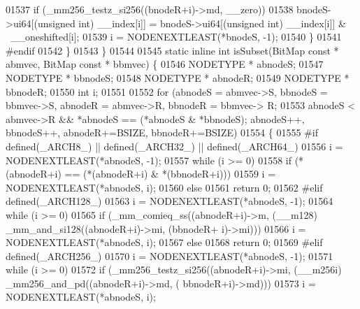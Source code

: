 \begin{DoxyCode}
{01537                         \textcolor{keywordflow}{if} (\_mm256\_testz\_si256((bnodeR+i)->md, \_\_zero))
01538                                 bnodeS->ui64[(\textcolor{keywordtype}{unsigned} int) \_\_index[i]] = bnodeS->ui64[(\textcolor{keywordtype}{unsigned} \textcolor{keywordtype}{int}) 
      \_\_index[i]] & ~\_\_oneshifted[i];
01539                         i = NODENEXTLEAST(*bnodeS, -1);
01540                 \}
01541 \textcolor{preprocessor}{#endif}
01542         \}
01543 \}
01544 
01545 \textcolor{keyword}{static} \textcolor{keyword}{inline} \textcolor{keywordtype}{int} isSubset(BitMap \textcolor{keyword}{const} * abmvec, BitMap \textcolor{keyword}{const} * bbmvec) \{
01546         NODETYPE * abnodeS;
01547         NODETYPE * bbnodeS;
01548         NODETYPE * abnodeR;
01549         NODETYPE * bbnodeR;
01550         \textcolor{keywordtype}{int} i;
01551 
01552         \textcolor{keywordflow}{for} (abnodeS = abmvec->S, bbnodeS = bbmvec->S, abnodeR = abmvec->R, bbnodeR = bbmvec->
      R;
01553                         abnodeS < abmvec->R && *abnodeS == (*abnodeS & *bbnodeS); abnodeS++, bbnodeS++, 
      abnodeR+=BSIZE, bbnodeR+=BSIZE)
01554         \{
01555 \textcolor{preprocessor}{#if defined(\_ARCH8\_) || defined(\_ARCH32\_) || defined(\_ARCH64\_)}
01556                 i = NODENEXTLEAST(*abnodeS, -1);
01557                 \textcolor{keywordflow}{while} (i >= 0)
01558                         \textcolor{keywordflow}{if} (*(abnodeR+i) == (*(abnodeR+i) & *(bbnodeR+i)))
01559                                 i = NODENEXTLEAST(*abnodeS, i);
01560                         \textcolor{keywordflow}{else}
01561                                 \textcolor{keywordflow}{return} 0;
01562 \textcolor{preprocessor}{#elif defined(\_ARCH128\_)}
01563                 i = NODENEXTLEAST(*abnodeS, -1);
01564                 \textcolor{keywordflow}{while} (i >= 0)
01565                         \textcolor{keywordflow}{if} (\_mm\_comieq\_ss((abnodeR+i)->m, (\_\_m128) \_mm\_and\_si128((abnodeR+i)->mi, (bbnodeR+
      i)->mi)))
01566                                 i = NODENEXTLEAST(*abnodeS, i);
01567                         \textcolor{keywordflow}{else}
01568                                 \textcolor{keywordflow}{return} 0;
01569 \textcolor{preprocessor}{#elif defined(\_ARCH256\_)}
01570                 i = NODENEXTLEAST(*abnodeS, -1);
01571                 \textcolor{keywordflow}{while} (i >= 0)
01572                         \textcolor{keywordflow}{if} (\_mm256\_testz\_si256((abnodeR+i)->mi, (\_\_m256i) \_mm256\_and\_pd((abnodeR+i)->md, (
      bbnodeR+i)->md)))
01573                                 i = NODENEXTLEAST(*abnodeS, i);
}
\end{DoxyCode}
